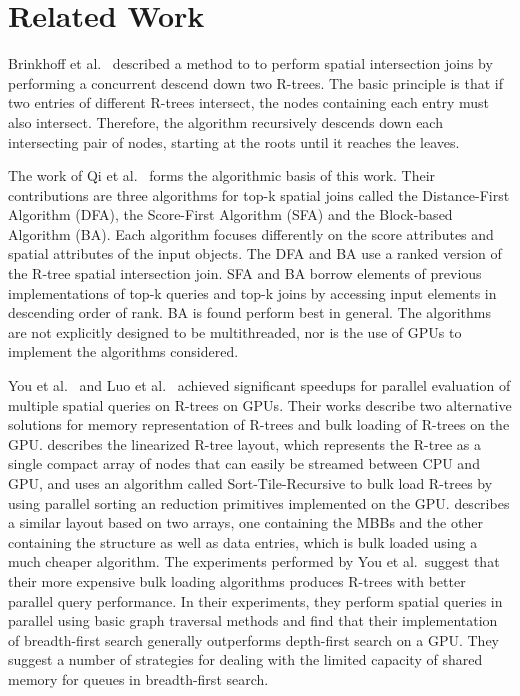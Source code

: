 \section{Related Work}

Brinkhoff et al.~\cite{brinkhoff1993efficient} described a method to to perform spatial intersection joins by performing a concurrent descend down two R-trees. The basic principle is that if two entries of different R-trees intersect, the nodes containing each entry must also intersect. Therefore, the algorithm recursively descends down each intersecting pair of nodes, starting at the roots until it reaches the leaves.

The work of Qi et al.~\cite{qi2013efficient} forms the algorithmic basis of this work. Their contributions are three algorithms for top-k spatial joins called the Distance-First Algorithm (DFA), the Score-First Algorithm (SFA) and the Block-based Algorithm (BA). Each algorithm focuses differently on the score attributes and spatial attributes of the input objects. The DFA and BA use a ranked version of the R-tree spatial intersection join. SFA and BA borrow elements of previous implementations of top-k queries and top-k joins by accessing input elements in descending order of rank. BA is found perform best in general. The algorithms are not explicitly designed to be multithreaded, nor is the use of GPUs to implement the algorithms considered.

You et al.~\cite{you2013parallel} and Luo et al.~\cite{luo2012parallel} achieved significant speedups for parallel evaluation of multiple spatial queries on R-trees on GPUs. Their works describe two alternative solutions for memory representation of R-trees and bulk loading of R-trees on the GPU. \cite{you2013parallel} describes the linearized R-tree layout, which represents the R-tree as a single compact array of nodes that can easily be streamed between CPU and GPU, and uses an algorithm called Sort-Tile-Recursive to bulk load R-trees by using parallel sorting an reduction primitives implemented on the GPU. \cite{luo2012parallel} describes a similar layout based on two arrays, one containing the MBBs and the other containing the structure as well as data entries, which is bulk loaded using a much cheaper algorithm. The experiments performed by You et al.~suggest that their more expensive bulk loading algorithms produces R-trees with better parallel query performance. In their experiments, they perform spatial queries in parallel using basic graph traversal methods and find that their implementation of breadth-first search generally outperforms depth-first search on a GPU. They suggest a number of strategies for dealing with the limited capacity of shared memory for queues in breadth-first search.

